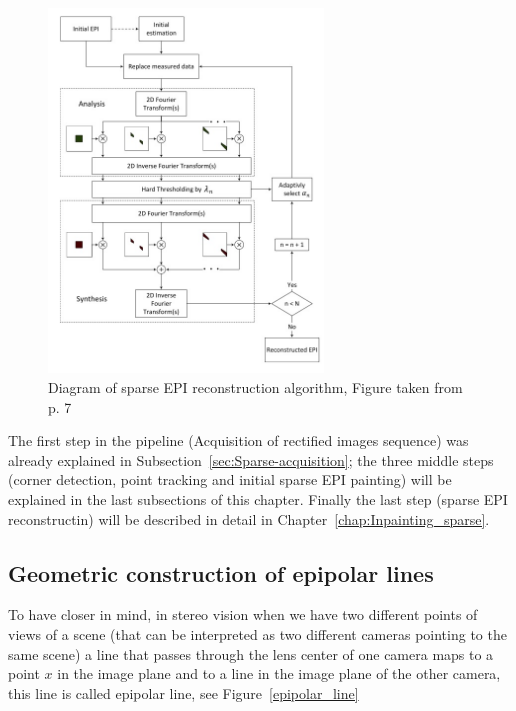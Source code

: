 \begin{figure}[h!]
\centering
\includegraphics[width = 0.65\textwidth]{./Diagrams/Sparse_rec_diagram.jpg}
\caption{Diagram of sparse EPI reconstruction algorithm, Figure taken from \cite{LF-Shearlets} p. 7}
\label{fig:EPI_rec}
\end{figure}

The first step in the pipeline (Acquisition of rectified images sequence) was already explained in Subsection~\ref{sec:Sparse-acquisition}; the three middle steps (corner detection, point tracking and initial sparse EPI painting) will be explained in the last subsections of this chapter. Finally the last step (sparse EPI reconstructin) will be described in detail in Chapter~\ref{chap:Inpainting_sparse}.

\subsection{Geometric construction of epipolar lines}

To have closer in mind, in stereo vision when we have two different points of views of a scene (that can be interpreted as two different cameras pointing to the same scene) a line that passes through the lens center of one camera maps to a point $x$ in the image plane and to a line in the image plane of the other camera, this line is called epipolar line, see Figure~\ref{epipolar_line}


